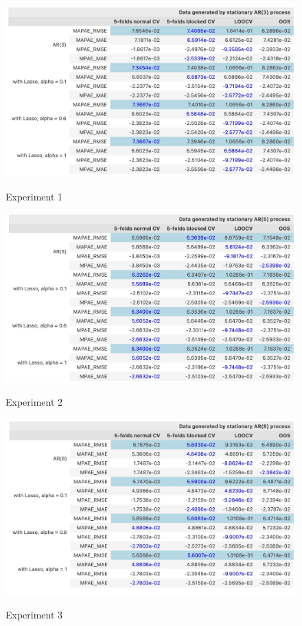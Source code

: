 \documentclass[12pt, oneside]{amsart}
\theoremstyle{definition}
\theoremstyle{remark}
\numberwithin{equation}{section}
\begin{document}
\begin{figure}[hbt!]
    \caption{Experiment 1}
    \centering
    \includegraphics[scale=0.3]{Figures/ar3data_ar3.jpg}
    \label{ar3data_ar3}
\end{figure}
\FloatBarrier

\begin{figure}[hbt!]
    \caption{Experiment 2}
    \centering
    \includegraphics[scale=0.3]{Figures/ar5data_ar5.jpg}
    \label{ar5data_ar5}
\end{figure}
\FloatBarrier

\begin{figure}[hbt!]
    \caption{Experiment 3}
    \centering
    \includegraphics[scale=0.3]{Figures/ar8data_ar8.jpg}
    \label{ar8data_ar8}
\end{figure}
\FloatBarrier
\end{document}
